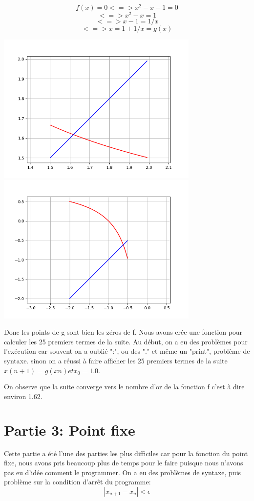 \documentclass{article}
\begin{document}
$$f(x) = 0 <=> x^2-x-1 = 0$$
$$         <=>  x^2-x = 1  $$
$$         <=>  x-1 = 1/x $$ 
$$         <=>  x = 1+1/x = g(x)$$	

\includegraphics[width=10cm]{figure_1-2.png}
	$$ $$
\includegraphics[width=10cm]{figure_131.png}

	Donc les points de g sont bien les zéros de f.
Nous avons crée une fonction pour calculer les 25 premiers termes de la suite. Au début, on a eu des problèmes pour l'exécution car souvent on a oublié ":", ou des "." et même un "print", problème de syntaxe. sinon on a réussi à faire afficher les 25 premiers termes de la suite $x(n+1)=g(xn) et x_{0}=1.0$. 

On observe que la suite converge vers le nombre d'or de la fonction f c'est à dire environ 1.62.

\section{Partie 3: Point fixe}
	Cette partie a été l'une des parties les plus difficiles car pour la fonction du point fixe, nous avons pris beaucoup plus de temps pour le faire puisque nous n'avons pas eu d'idée comment le programmer.
On a eu des problèmes de syntaxe, puis problème sur la condition d'arrêt du programme:$$\left|x_{n+1}-x_{n}\right| < \epsilon$$
\end{document}
